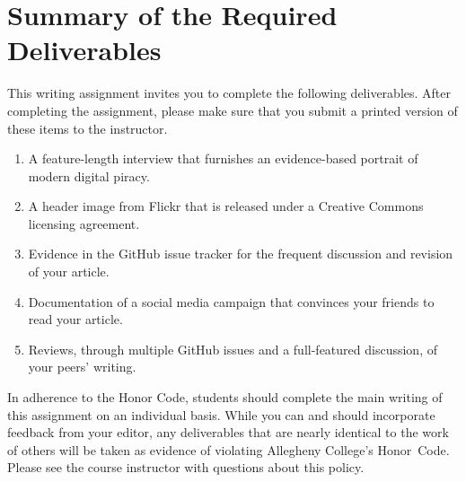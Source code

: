 \vspace*{-.15in}
\section*{Summary of the Required Deliverables}

This writing assignment invites you to complete the following deliverables. After completing the assignment, please make
sure that you submit a printed version of these items to the instructor.

\vspace*{-.1in}
\begin{enumerate}
  \setlength{\itemsep}{-.01in}

  \item A feature-length interview that furnishes an evidence-based portrait of modern digital piracy.
  \item A header image from Flickr that is released under a Creative Commons licensing agreement.
  \item Evidence in the GitHub issue tracker for the frequent discussion and revision of your article.
  \item Documentation of a social media campaign that convinces your friends to read your article.
  \item Reviews, through multiple GitHub issues and a full-featured discussion, of your peers' writing.

\end{enumerate}
\vspace*{-.1in}


In adherence to the Honor Code, students should complete the main writing of this assignment on an individual basis.
While you can and should incorporate feedback from your editor, any deliverables that are nearly identical to the work
of others will be taken as evidence of violating Allegheny College's \mbox{Honor Code}. Please see the course instructor
with questions about this policy.


